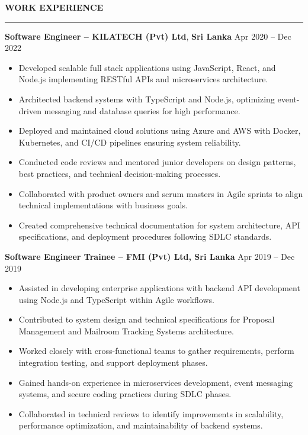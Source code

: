 \documentclass[10pt,letterpaper]{article}
\begin{document}
\vspace{8pt}

\textbf{WORK EXPERIENCE}\\[-8pt]
\noindent\rule{\textwidth}{1pt}

\vspace{-2pt}

\textbf{Software Engineer -- KILATECH (Pvt) Ltd}, \textbf{Sri Lanka} \hfill Apr 2020 -- Dec 2022

\vspace{-1pt}

\begin{itemize}
\item Developed scalable full stack applications using JavaScript, React, and Node.js implementing RESTful APIs and microservices architecture.
\item Architected backend systems with TypeScript and Node.js, optimizing event-driven messaging and database queries for high performance.
\item Deployed and maintained cloud solutions using Azure and AWS with Docker, Kubernetes, and CI/CD pipelines ensuring system reliability.
\item Conducted code reviews and mentored junior developers on design patterns, best practices, and technical decision-making processes.
\item Collaborated with product owners and scrum masters in Agile sprints to align technical implementations with business goals.
\item Created comprehensive technical documentation for system architecture, API specifications, and deployment procedures following SDLC standards.
\end{itemize}

\textbf{Software Engineer Trainee -- FMI (Pvt) Ltd, Sri Lanka} \hfill Apr 2019 -- Dec 2019

\vspace{-1pt}

\begin{itemize}
\item Assisted in developing enterprise applications with backend API development using Node.js and TypeScript within Agile workflows.
\item Contributed to system design and technical specifications for Proposal Management and Mailroom Tracking Systems architecture.
\item Worked closely with cross-functional teams to gather requirements, perform integration testing, and support deployment phases.
\item Gained hands-on experience in microservices development, event messaging systems, and secure coding practices during SDLC phases.
\item Collaborated in technical reviews to identify improvements in scalability, performance optimization, and maintainability of backend systems.
\end{itemize}
\end{document}
